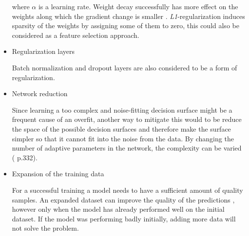 \begin{itemize}
	where $\alpha$ is a learning rate. Weight decay successfully has more effect on the weights along which the gradient change is smaller \cite{Goodfellow_2016}. \emph{L1}-regularization induces sparsity of the weights by assigning some of them to zero, this could also be considered as a feature selection approach.

	\item Regularization layers

	Batch normalization and dropout layers are also considered to be a form of regularization.

	\item Network reduction

	Since learning a too complex and noise-fitting decision surface might be a frequent cause of an overfit, another way to mitigate this would to be reduce the space of the possible decision surfaces and therefore make the surface simpler so that it cannot fit into the noise from the data. By changing the number of adaptive parameters in the network, the complexity can be varied (\cite{Bishop_2006} p.332).

	\item Expansion of the training data

	For a successful training a model needs to have a sufficient amount of quality samples. An expanded dataset can improve the quality of the predictions \cite{Ying_2019}, however only when the model has already performed well on the initial dataset. If the model was performing badly initially, adding more data will not solve the problem.
\end{itemize}
